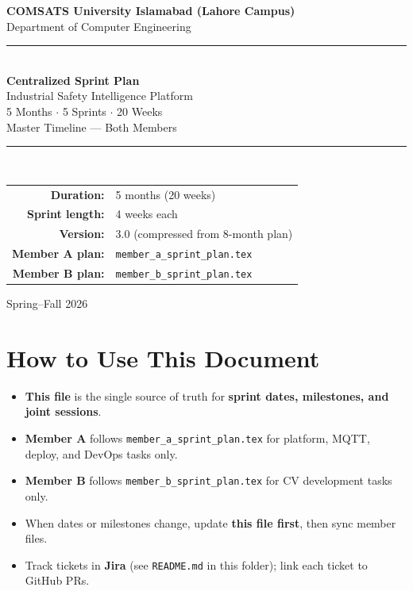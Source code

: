 \documentclass[12pt,a4paper]{article}
\begin{document}

\begin{titlepage}
\centering
\vspace*{1cm}
{\Large\color{primary}\textbf{COMSATS University Islamabad (Lahore Campus)}}\\[0.2cm]
{\large Department of Computer Engineering}\\[0.5cm]
\rule{\textwidth}{2pt}\\[0.8cm]
{\Huge\bfseries\color{primary} Centralized Sprint Plan}\\[0.4cm]
{\Large Industrial Safety Intelligence Platform}\\[0.2cm]
{\large 5 Months $\cdot$ 5 Sprints $\cdot$ 20 Weeks}\\[0.2cm]
{\large Master Timeline --- Both Members}\\[0.3cm]
\rule{\textwidth}{2pt}\\[1cm]
\begin{tabular}{rl}
\textbf{Duration:} & 5 months (20 weeks) \\
\textbf{Sprint length:} & 4 weeks each \\
\textbf{Version:} & 3.0 (compressed from 8-month plan) \\
\textbf{Member A plan:} & \texttt{member\_a\_sprint\_plan.tex} \\
\textbf{Member B plan:} & \texttt{member\_b\_sprint\_plan.tex} \\
\end{tabular}
\vfill
{\large Spring--Fall 2026}
\end{titlepage}

\tableofcontents
\newpage

\section{How to Use This Document}

\begin{itemize}
    \item \textbf{This file} is the single source of truth for \textbf{sprint dates, milestones, and joint sessions}.
    \item \textbf{Member A} follows \texttt{member\_a\_sprint\_plan.tex} for platform, MQTT, deploy, and DevOps tasks only.
    \item \textbf{Member B} follows \texttt{member\_b\_sprint\_plan.tex} for CV development tasks only.
    \item When dates or milestones change, update \textbf{this file first}, then sync member files.
    \item Track tickets in \textbf{Jira} (see \texttt{README.md} in this folder); link each ticket to GitHub PRs.
\end{itemize}
\end{document}
